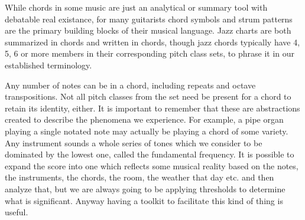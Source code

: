 \documentclass[review=true, 10pt, sigplan]{acmart}
\newcommand{\postDoc}{}
\begin{document}
While chords in some music are just an analytical or summary tool with
debatable real existance, for many guitarists chord symbols and strum patterns
are the primary building blocks of their musical language.  Jazz charts are both
summarized in chords and written in chords, though jazz chords typically have 4,
5, 6 or more members in their corresponding pitch class sets, to phrase it in
our established terminology.

Any number of notes can be in a chord, including repeats and octave transpositions.
Not all pitch classes from the set need be present for a chord to retain its identity, either.
It is important to remember that these are abstractions created to describe the
phenomena we experience.  For example, a pipe organ playing a single notated
note may actually be playing a chord of some variety.  Any instrument sounds a
whole series of tones which we consider to be dominated by the lowest one,
called the fundamental frequency. It is possible to expand the score into one
which reflects some musical reality based on the notes, the instruments, the
chords, the room, the weather that day etc. and then analyze that, but we are
always going to be applying thresholds to determine what is significant.  Anyway
having a toolkit to facilitate this kind of thing is useful.

\postDoc
\end{document}
